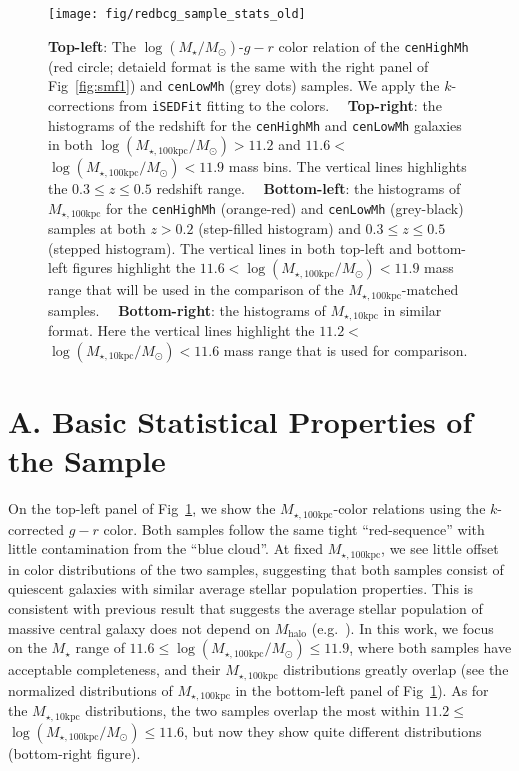 \documentclass[a4paper,fleqn,usenatbib]{mnras}
\def\rbcg{\texttt{cenHighMh}}
\def\nbcg{\texttt{cenLowMh}}
\def\mstar{{$M_{\star}$}}
\def\mhalo{{$M_{\mathrm{halo}}$}}
\def\logms{{$\log (M_{\star}/M_{\odot})$}}
\def\minn{{$M_{\star,10\mathrm{kpc}}$}}
\def\mtot{{$M_{\star,100\mathrm{kpc}}$}}
\def\logminn{{$\log (M_{\star,10\mathrm{kpc}}/M_{\odot})$}}
\def\logmtot{{$\log (M_{\star,100\mathrm{kpc}}/M_{\odot})$}}
\begin{document}
  \begin{figure}
      \centering 
      \texttt{[image: fig/redbcg\_sample\_stats\_old]}
      \caption{
          \textbf{Top-left}: The \logms{}-$g-r$ color relation of the \rbcg{} 
          (red circle; detaield format is the same with the right panel of 
          Fig~\ref{fig:smf1}) and \nbcg{} (grey dots) samples.
          We apply the $k$-corrections from \texttt{iSEDFit} fitting to the colors.~~          
          \textbf{Top-right}: the histograms of the redshift for the \rbcg{} and 
          \nbcg{} galaxies in both \logmtot$>11.2$ and $11.6<$\logmtot{}$<11.9$
          mass bins.
          The vertical lines highlights the $0.3\leq z \leq 0.5$ redshift range.~~
          \textbf{Bottom-left}: the histograms of \mtot{} for the \rbcg{} (orange-red) 
          and \nbcg{} (grey-black) samples at both $z>0.2$ (step-filled histogram) and 
          $0.3 \leq z \leq 0.5$ (stepped histogram). 
          The vertical lines in both top-left and bottom-left figures highlight the 
          $11.6<$\logmtot{}$<11.9$ mass range that will be used in the comparison of 
          the \mtot{}-matched samples.~~
          \textbf{Bottom-right}: the histograms of \minn{} in similar format. 
          Here the vertical lines highlight the 
          $11.2<$\logminn{}$<11.6$ mass range that is used for comparison.
      }
      \label{fig:sample_stats}
  \end{figure}

\section{A. Basic Statistical Properties of the Sample} 
	\label{app:basic} 
    
    On the top-left panel of Fig~\ref{fig:sample_stats}, we show the \mtot{}-color 
    relations using the $k$-corrected $g-r$ color. 
    Both samples follow the same tight ``red-sequence'' with little contamination 
    from the ``blue cloud''.
    At fixed \mtot{}, we see little offset in color distributions of the two 
    samples, suggesting that both samples consist of quiescent galaxies with 
    similar average stellar population properties.  
    This is consistent with previous result that suggests the average stellar 
    population of massive central galaxy does not depend on \mhalo{} 
    (e.g.\ \citealt{Park2007}).  
    In this work, we focus on the \mstar{} range of $11.6 \le$\logmtot{}$\le 11.9$, 
    where both samples have acceptable completeness, and their \mtot{} distributions 
    greatly overlap (see the normalized distributions of \mtot{} in the bottom-left 
    panel of Fig~\ref{fig:sample_stats}). 
    As for the \minn{} distributions, the two samples overlap the most within 
    $11.2 \le$\logmtot{}$\le 11.6$, but now they show quite different
    distributions (bottom-right figure).
    
\end{document}
